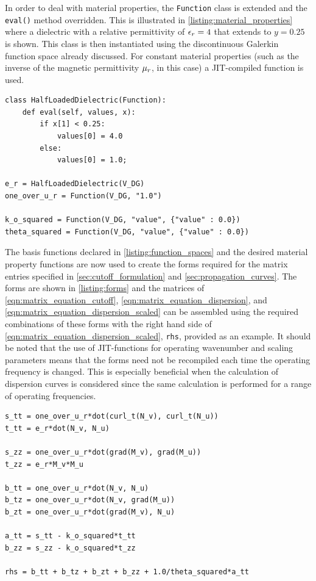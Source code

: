 In order to deal with material properties, the {\tt Function} class is
extended and the {\tt eval()} method overridden. This is illustrated
in \lstlistingname{} \ref{listing:material_properties} where a
dielectric with a relative permittivity of $\epsilon_r = 4$ that extends to
$y = 0.25$ is shown. This class is then instantiated using the
discontinuous Galerkin function space already discussed. For constant
material properties (such as the inverse of the magnetic permittivity
$\mu_r$, in this case) a JIT-compiled function is used.

\begin{lstlisting}[float=ht, caption=Material properties and functions., label=listing:material_properties]
class HalfLoadedDielectric(Function):
    def eval(self, values, x):
        if x[1] < 0.25:
            values[0] = 4.0
        else:
            values[0] = 1.0;

e_r = HalfLoadedDielectric(V_DG)
one_over_u_r = Function(V_DG, "1.0")

k_o_squared = Function(V_DG, "value", {"value" : 0.0})
theta_squared = Function(V_DG, "value", {"value" : 0.0})
\end{lstlisting}

The basis functions declared in \lstlistingname{}
 \ref{listing:function_spaces} and the desired material property
 functions are now used to create the forms required for the matrix
 entries specified in \ref{sec:cutoff_formulation} and
 \ref{sec:propagation_curves}. The forms are shown in
 \lstlistingname{} \ref{listing:forms} and the matrices of
 \eqref{eqn:matrix_equation_cutoff},
 \eqref{eqn:matrix_equation_dispersion}, and
 \eqref{eqn:matrix_equation_dispersion_scaled} can be assembled using
 the required combinations of these forms with the right hand side of
 \eqref{eqn:matrix_equation_dispersion_scaled}, {\tt rhs}, provided as
 an example.  It should be noted that the use of JIT-functions for
 operating wavenumber and scaling parameters means that the forms need
 not be recompiled each time the operating frequency is changed. This
 is especially beneficial when the calculation of dispersion curves is
 considered since the same calculation is performed for a range of
 operating frequencies.

\begin{lstlisting}[float=hb, caption=Forms for matrix entries., label=listing:forms]
s_tt = one_over_u_r*dot(curl_t(N_v), curl_t(N_u))
t_tt = e_r*dot(N_v, N_u)

s_zz = one_over_u_r*dot(grad(M_v), grad(M_u))
t_zz = e_r*M_v*M_u

b_tt = one_over_u_r*dot(N_v, N_u)
b_tz = one_over_u_r*dot(N_v, grad(M_u))
b_zt = one_over_u_r*dot(grad(M_v), N_u)

a_tt = s_tt - k_o_squared*t_tt
b_zz = s_zz - k_o_squared*t_zz

rhs = b_tt + b_tz + b_zt + b_zz + 1.0/theta_squared*a_tt
\end{lstlisting}

